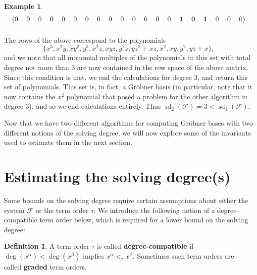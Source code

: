 \documentclass[11pt]{article}
\newcommand{\F}{\mathcal{F}}
\DeclareMathOperator{\sd}{sd}
\theoremstyle{definition}
\newtheorem{definition}{Definition}
\newtheorem{example}{Example}
\begin{document}
\begin{example}
\[\begin{blockarray}{cccccccccccccccccccc}
\begin{block}{(cccccccccccccccccccc)}
			0 & 0 & 0 & 0 & 0 & 0 & 0 & 0 & 0 & 0 & 0 & 0 & 0 & 0 & \mathbf{1} & 0 & \mathbf{1} & 0 & 0 & 0 \\
		\end{block}
	\end{blockarray} \] The rows of the above correspond to the polynomials \[ \{x^3, x^2y, xy^2, y^3, x^2z, xyz, y^2z, yz^2 + xz, x^2, xy, y^2, yz + x\}, \] and we note that all monomial multiples of the polynomials in this set with total degree not more than 3 are now contained in the row space of the above matrix. Since this condition is met, we end the calculations for degree 3, and return this set of polynomials. This set is, in fact, a Gröbner basis (in particular, note that it now contains the $x^2$ polynomial that posed a problem for the other algorithm in degree 3), and so we end calculations entirely. Thus $\sd_2(\F) = 3 < \sd_1(\F)$. 
\end{example}


Now that we have two different algorithms for computing Gröbner bases with two different notions of the solving degree, we will now explore some of the invariants used to estimate them in the next section. 



\section{Estimating the solving degree(s)}


Some bounds on the solving degree require certain assumptions about either the system $\F$ or the term order $\tau$. We introduce the following notion of a degree-compatible term order below, which is required for a lower bound on the solving degree:


\begin{definition}
	A term order $\tau$ is called \textbf{degree-compatible} if $\deg(x^\alpha) < \deg(x^\beta)$ implies $x^\alpha <_\tau x^\beta$. Sometimes such term orders are called \textbf{graded} term orders. 
\end{definition}
\end{document}
